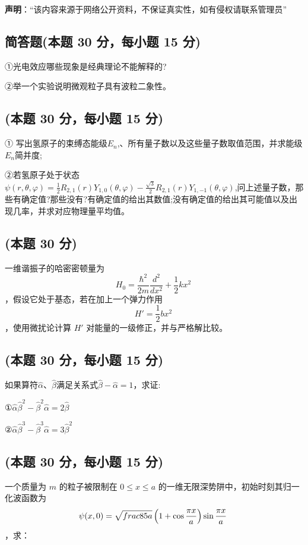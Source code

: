 
\textbf{声明}：“该内容来源于网络公开资料，不保证真实性，如有侵权请联系管理员”

\subsection{简答题(本题 30 分，每小题 15 分)}
①光电效应哪些现象是经典理论不能解释的?

②举一个实验说明微观粒子具有波粒二象性。

\subsection{(本题 30 分，每小题 15 分)}
① 写出氢原子的束缚态能级$E_n$,、所有量子数以及这些量子数取值范围，并求能级$E_n$简并度;

②若氢原子处于状态$\psi(r, \theta, \varphi) = \frac{1}{2} R_{2,1}(r) Y_{1,0}(\theta, \varphi) - \frac{\sqrt{3}}{2} R_{2,1}(r) Y_{1,-1}(\theta, \varphi)$,问上述量子数，那些有确定值?那些没有?有确定值的给出其数值;没有确定值的给出其可能值以及出现几率，并求对应物理量平均值。

\subsection{(本题 30 分)}
一维谐振子的哈密密顿量为 $$ H_0 = \frac{\hbar^2}{2m} \frac{d^2}{dx^2} + \frac{1}{2} k x^2~$$，假设它处于基态，若在加上一个弹力作用$$H' = \frac{1}{2} b x^2~$$，使用微扰论计算 $H'$ 对能量的一级修正，并与严格解比较。

\subsection{(本题 30 分，每小题 15 分)}
如果算符$\hat \alpha$、$\hat \beta$满足关系式$\hat \beta-\hat \alpha=1$，求证:

①$\hat \alpha\hat \beta^2-\hat \beta^2\hat \alpha=2\hat \beta$

②$\hat \alpha\hat \beta^3-\hat \beta^3\hat \alpha=3\hat \beta^2$

\subsection{(本题 30 分，每小题 15 分)}
一个质量为 $m$ 的粒子被限制在 $0 \leq x \leq a$ 的一维无限深势阱中，初始时刻其归一化波函数为 
$$ \psi(x,0) = \sqrt{\\frac{8}{5a}} \left( 1 + \cos \frac{\pi x}{a} \right) \sin \frac{\pi x}{a} ~$$ ，求：
